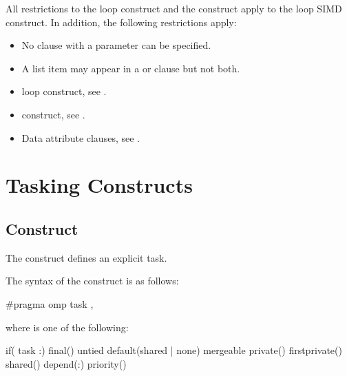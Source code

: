 \restrictions
All restrictions to the loop construct and the  construct apply to the loop SIMD 
construct. In addition, the following restrictions apply:

\begin{itemize}
\item No  clause with a parameter can be specified.
\item A list item may appear in a  or  clause but not both.
\end{itemize}

\begin{samepage}
\crossreferences
\begin{itemize}
\item loop construct, see 
.

\item {} construct, see 
.

\item Data attribute clauses, see 
. 
\end{itemize}
\end{samepage}



\pagebreak
\section{Tasking Constructs}
\label{sec:Tasking Constructs}
\subsection{ Construct}
\label{subsec:task Construct}
\summary
The  construct defines an explicit task.

\begin{samepage}
\syntax
\ccppspecificstart
The syntax of the  construct is as follows: 

\begin{boxedcode}
\#pragma omp task \plc{[clause[ [},\plc{] clause] ... ] new-line}
\end{boxedcode}
\end{samepage}

\begin{samepage}
where  is one of the following: 

\begin{indentedcodelist}
if(\plc{[} task :\plc{] scalar-expression})
final()
untied
default(shared \textnormal{|} none)
mergeable
private()
firstprivate()
shared()
depend(:)
priority()
\end{indentedcodelist}
\ccppspecificend
\end{samepage}

